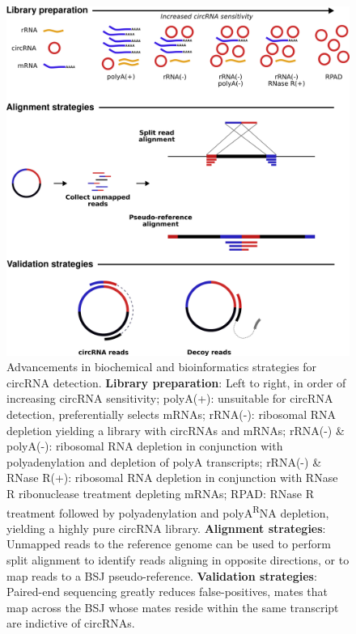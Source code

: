 \documentclass[journal,review,submit,pdftex,moreauthors]{Definitions/mdpi}
\begin{document}
\begin{figure}
    \begin{center}
        \includegraphics[width=\textwidth]{artefacts.png}
        \caption{Advancements in biochemical and bioinformatics strategies for circRNA detection. \textbf{Library preparation}: Left to right, in order of increasing circRNA sensitivity; polyA(+): unsuitable for circRNA detection, preferentially selects mRNAs; rRNA(-): ribosomal RNA depletion yielding a library with circRNAs and mRNAs; rRNA(-) \& polyA(-): ribosomal RNA depletion in conjunction with polyadenylation and depletion of polyA transcripts; rRNA(-) \& RNase R(+): ribosomal RNA depletion in conjunction with RNase R ribonuclease treatment depleting mRNAs; RPAD: RNase R treatment followed by polyadenylation and polyA\textsuperscript RNA depletion, yielding a highly pure circRNA library. \textbf{Alignment strategies}: Unmapped reads to the reference genome can be used to perform split alignment to identify reads aligning in opposite directions, or to map reads to  a BSJ pseudo-reference. \textbf{Validation strategies}: Paired-end sequencing greatly reduces false-positives, mates that map across the BSJ whose mates reside within the same transcript are indictive of circRNAs.}
        \label{artefacts}
    \end{center}
\end{figure}
\end{document}
